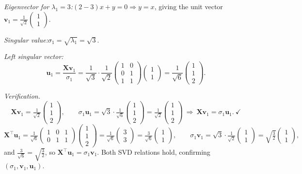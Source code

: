 \documentclass[12pt,a4paper]{article}
\theoremstyle{definition}
\newcommand{\Xb}{\mathbf{X}}
\newcommand{\vv}{\mathbf{v}}
\newcommand{\uu}{\mathbf{u}}
\newcommand{\T}{^{\!\top}}
\begin{document}
\emph{Eigenvector for $\lambda_1=3$:}\quad $(2-3)x+y=0\Rightarrow y=x$, giving the
unit vector $\displaystyle\vv_1=\tfrac{1}{\sqrt2}\begin{pmatrix}1\\1\end{pmatrix}.$

\emph{Singular value:}\quad $\sigma_1=\sqrt{\lambda_1}=\sqrt3.$

\emph{Left singular vector:}\quad
\[
\uu_1=\frac{\Xb\vv_1}{\sigma_1}
=\frac{1}{\sqrt3}\cdot\frac{1}{\sqrt2}\begin{pmatrix}1&0\\0&1\\1&1\end{pmatrix}\!\begin{pmatrix}1\\1\end{pmatrix}
=\frac{1}{\sqrt6}\begin{pmatrix}1\\1\\2\end{pmatrix}.
\]

\emph{Verification.}
\[
\Xb\vv_1=\tfrac{1}{\sqrt2}\begin{pmatrix}1\\1\\2\end{pmatrix},
\qquad
\sigma_1\uu_1=\sqrt3\cdot\tfrac{1}{\sqrt6}\begin{pmatrix}1\\1\\2\end{pmatrix}
=\tfrac{1}{\sqrt2}\begin{pmatrix}1\\1\\2\end{pmatrix}
\ \Rightarrow\ \Xb\vv_1=\sigma_1\uu_1.\ \checkmark
\]
\[
\Xb\T\uu_1=\tfrac{1}{\sqrt6}\begin{pmatrix}1&0&1\\0&1&1\end{pmatrix}\!\begin{pmatrix}1\\1\\2\end{pmatrix}
=\tfrac{1}{\sqrt6}\begin{pmatrix}3\\3\end{pmatrix}
=\tfrac{3}{\sqrt6}\begin{pmatrix}1\\1\end{pmatrix},
\qquad
\sigma_1\vv_1=\sqrt3\cdot\tfrac{1}{\sqrt2}\begin{pmatrix}1\\1\end{pmatrix}
=\sqrt{\tfrac32}\begin{pmatrix}1\\1\end{pmatrix},
\]
and $\tfrac{3}{\sqrt6}=\sqrt{\tfrac32}$, so $\Xb\T\uu_1=\sigma_1\vv_1.$ \checkmark
Both SVD relations hold, confirming $(\sigma_1,\vv_1,\uu_1)$.
\end{document}
